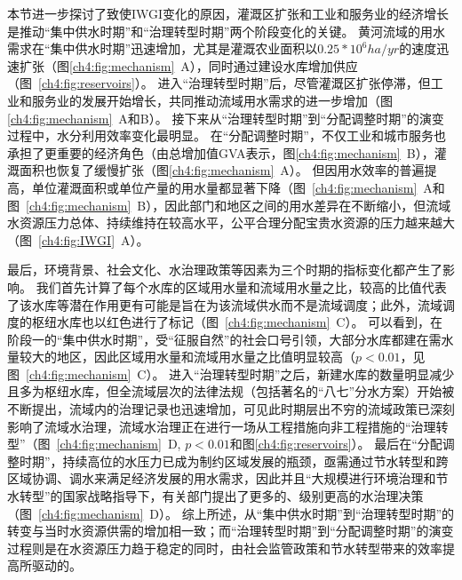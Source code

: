 本节进一步探讨了致使IWGI变化的原因，灌溉区扩张和工业和服务业的经济增长是推动“集中供水时期”和“治理转型时期”两个阶段变化的关键。
黄河流域的用水需求在“集中供水时期”迅速增加，尤其是灌溉农业面积以$0.25*10^6 ha/yr$的速度迅速扩张（图\ref{ch4:fig:mechanism}~A），同时通过建设水库增加供应（图~\ref{ch4:fig:reservoirs}）。
进入“治理转型时期”后，尽管灌溉区扩张停滞，但工业和服务业的发展开始增长，共同推动流域用水需求的进一步增加（图\ref{ch4:fig:mechanism}~A和B）。
接下来从“治理转型时期”到“分配调整时期”的演变过程中，水分利用效率变化最明显。
在“分配调整时期”，不仅工业和城市服务也承担了更重要的经济角色（由总增加值GVA表示，图\ref{ch4:fig:mechanism}~B），灌溉面积也恢复了缓慢扩张（图\ref{ch4:fig:mechanism}~A）。
但因用水效率的普遍提高，单位灌溉面积或单位产量的用水量都显著下降（图~\ref{ch4:fig:mechanism}~A和图~\ref{ch4:fig:mechanism}~B），因此部门和地区之间的用水差异在不断缩小，但流域水资源压力总体、持续维持在较高水平，公平合理分配宝贵水资源的压力越来越大（图~\ref{ch4:fig:IWGI}~A）。

最后，环境背景、社会文化、水治理政策等因素为三个时期的指标变化都产生了影响。
我们首先计算了每个水库的区域用水量和流域用水量之比，较高的比值代表了该水库等潜在作用更有可能是旨在为该流域供水而不是流域调度；此外，流域调度的枢纽水库也以红色进行了标记（图~\ref{ch4:fig:mechanism}~C）。
可以看到，在阶段一的“集中供水时期”，受“征服自然”的社会口号引领，大部分水库都建在需水量较大的地区，因此区域用水量和流域用水量之比值明显较高（$p<0.01$，见图~\ref{ch4:fig:mechanism}~C）。
进入“治理转型时期”之后，新建水库的数量明显减少且多为枢纽水库，但全流域层次的法律法规（包括著名的“八七”分水方案）开始被不断提出，流域内的治理记录也迅速增加，可见此时期层出不穷的流域政策已深刻影响了流域水治理，流域水治理正在进行一场从工程措施向非工程措施的“治理转型”（图~\ref{ch4:fig:mechanism}~D, $p<0.01$和图\ref{ch4:fig:reservoirs}）。
最后在“分配调整时期”，持续高位的水压力已成为制约区域发展的瓶颈，亟需通过节水转型和跨区域协调、调水来满足经济发展的用水需求，因此并且“大规模进行环境治理和节水转型”的国家战略指导下，有关部门提出了更多的、级别更高的水治理决策（图~\ref{ch4:fig:mechanism}~D）。
综上所述，从“集中供水时期”到“治理转型时期”的转变与当时水资源供需的增加相一致；而“治理转型时期”到“分配调整时期”的演变过程则是在水资源压力趋于稳定的同时，由社会监管政策和节水转型带来的效率提高所驱动的。